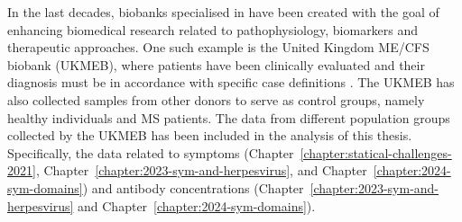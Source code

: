 In the last decades, biobanks specialised in \cfs have been created with the goal of enhancing biomedical research related to pathophysiology, biomarkers and therapeutic approaches.
One such example is the United Kingdom ME/CFS biobank (UKMEB), where \cfs patients have been clinically evaluated and their diagnosis must be in accordance with specific case definitions \citep{lacerda2017UKME, lacerda2018UKME}.
The UKMEB has also collected samples from other donors to serve as control groups, namely healthy individuals and MS patients.
The data from different population groups collected by the UKMEB has been included in the analysis of this thesis.
Specifically, the data related to symptoms (Chapter~\ref{chapter:statical-challenges-2021}, Chapter~\ref{chapter:2023-sym-and-herpesvirus}, and Chapter~\ref{chapter:2024-sym-domains}) and antibody concentrations (Chapter~\ref{chapter:2023-sym-and-herpesvirus} and Chapter~\ref{chapter:2024-sym-domains}).


